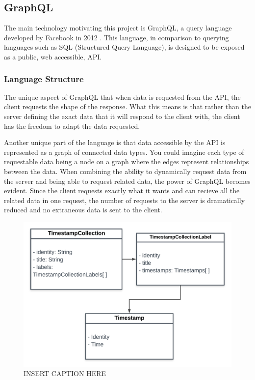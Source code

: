\subsection{GraphQL}
The main technology motivating this project is GraphQL, a query language developed by Facebook in 2012 \cite{byronKeynoteBriefHistory2019}.  This language, in comparison to querying languages such as SQL (Structured Query Language), is designed to be exposed as a public, web accessible, API.

\subsubsection{Language Structure}

The unique aspect of GraphQL that when data is requested from the API, the client requests the shape of the response.  What this means is that rather than the server defining the exact data that it will respond to the client with, the client has the freedom to adapt the data requested.

Another unique part of the language is that data accessible by the API is represented as a graph of connected data types.  You could imagine each type of requestable data being a node on a graph where the edges represent relationships between the data.  When combining the ability to dynamically request data from the server and being able to request related data, the power of GraphQL becomes evident.  Since the client requests exactly what it wants and can recieve all the related data in one request, the number of requests to the server is dramatically reduced and no extraneous data is sent to the client.

\begin{figure}[htbp]
    \centering
    \includegraphics[scale=.15]{img/schema-graph.png}
    \caption{INSERT CAPTION HERE}
    \label{fig:schema-graph}
\end{figure}

